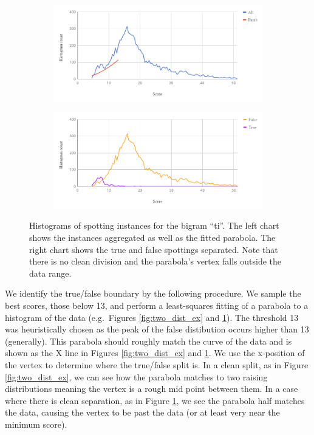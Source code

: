 \documentclass[ms,electronic,twosidetoc,letterpaper,chaptercenter,parttop,lof,lot]{byumsphd}
\begin{document}
\begin{figure}
    \centering
    \begin{subfigure}{.89\textwidth}
  		\centering
  		\includegraphics[width=.99\linewidth]{one_dist_ex_All}
	\end{subfigure}
	\begin{subfigure}{.89\textwidth}
  		\centering
  		\includegraphics[width=.99\linewidth]{one_dist_ex_TF}
	\end{subfigure}
    \caption{Histograms of spotting instances for the bigram ``ti''. The left chart shows the instances aggregated as well as the fitted parabola. The right chart shows the true and false spottings separated. Note that there is no clean division and the parabola's vertex falls outside the data range.
    }
    \label{fig:one_dist_ex}
\end{figure}

We identify the true/false boundary by the following procedure. We sample the best scores, those below 13, and perform a least-squares fitting of a parabola to a histogram of the data (e.g.~Figures \ref{fig:two_dist_ex} and \ref{fig:one_dist_ex}). The threshold 13 was heuristically chosen as the peak of the false distibution occurs higher than 13 (generally). This parabola should roughly match the curve of the data and is shown as the X line in Figures \ref{fig:two_dist_ex} and \ref{fig:one_dist_ex}. We use the x-position of the vertex to determine where the true/false split is. In a clean split, as in Figure \ref{fig:two_dist_ex}, we can see how the parabola matches to two raising distributions meaning the vertex is a rough mid point between them. In a case where there is clean separation, as in Figure \ref{fig:one_dist_ex}, we see the parabola half matches the data, causing the vertex to be past the data (or at least very near the minimum score).
\end{document}
